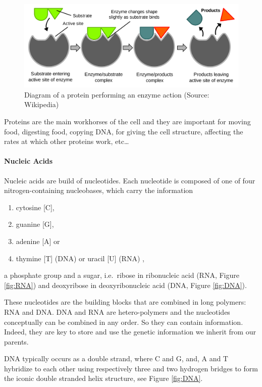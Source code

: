 \documentclass[
  11pt,
]{book}
\providecommand{\tightlist}{%
  \setlength{\itemsep}{0pt}\setlength{\parskip}{0pt}}
\begin{document}
\begin{figure}

{\centering \includegraphics[width=0.5\linewidth]{./figs/EnzymePadlockKey} 

}

\caption{Diagram of a protein performing an enzyme action (Source: Wikipedia)}\label{fig:enzyme}
\end{figure}

Proteins are the main workhorses of the cell and they are important for moving food, digesting food, copying DNA, for giving the cell structure, affecting the rates at which other proteins work, etc\ldots{}

\newpage

\hypertarget{sectionNucleicAcids}{%
\paragraph{Nucleic Acids}\label{sectionNucleicAcids}}

Nucleic acids are build of nucleotides.
Each nucleotide is composed of one of four nitrogen-containing nucleobases, which carry the information

\begin{enumerate}
\def\labelenumi{\arabic{enumi}.}
\tightlist
\item
  cytosine {[}C{]},
\item
  guanine {[}G{]},
\item
  adenine {[}A{]} or
\item
  thymine {[}T{]} (DNA) or uracil {[}U{]} (RNA) ,
\end{enumerate}

a phosphate group and a sugar, i.e.~ribose in ribonucleic acid (RNA, Figure \ref{fig:RNA}) and deoxyribose in deoxyribonucleic acid (DNA, Figure \ref{fig:DNA}).

These nucleotides are the building blocks that are combined in long polymers: RNA and DNA.
DNA and RNA are hetero-polymers and the nucleotides conceptually can be combined in any order.
So they can contain information.
Indeed, they are key to store and use the genetic information we inherit from our parents.

DNA typically occurs as a double strand, where C and G, and, A and T hybridize to each other using respectively three and two hydrogen bridges to form the iconic double stranded helix structure, see Figure \ref{fig:DNA}.
\end{document}
